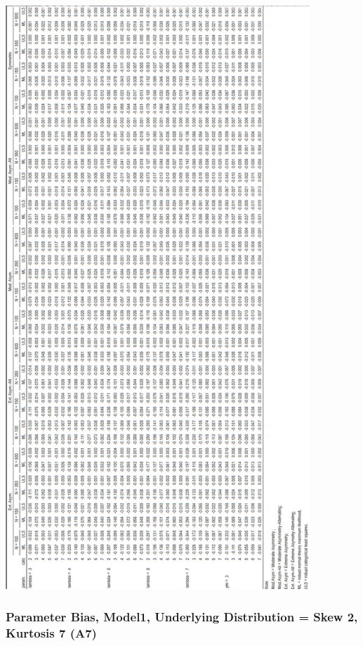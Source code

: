 \documentclass[10,a4paperpaper,]{article}
\begin{document}
\includegraphics[width=325pt]{./figures/tabA6}

\subsubsection{Parameter Bias, Model1, Underlying Distribution = Skew 2, Kurtosis 7 (A7)}
\end{document}

